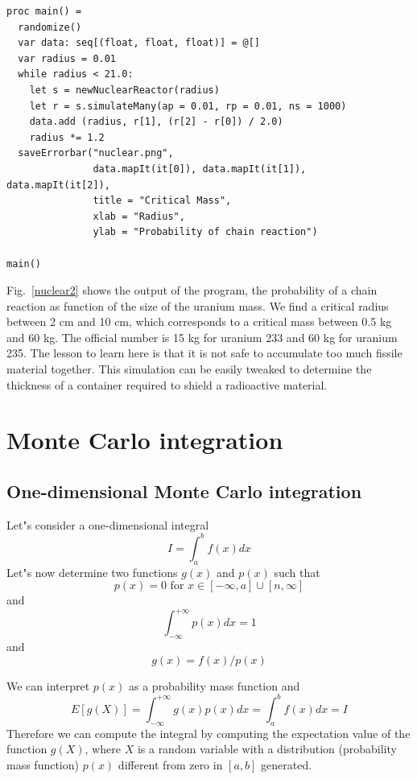 \documentclass[justified, sixbynine]{tufte-book}
\def\ft{\small\tt}
\theoremstyle{plain}%
\newtheorem * {corollary}{Corollary}
\theoremstyle{definition}
\theoremstyle{remark}
\newtheorem * {remark}{Remark}
\newtheorem * {note}{Note}
\begin{document}
\begin{fullwidth}
\begin{lstlisting}[caption={in file: {\ft nuclear.nim}}]
proc main() =
  randomize()
  var data: seq[(float, float, float)] = @[]
  var radius = 0.01
  while radius < 21.0:
    let s = newNuclearReactor(radius)
    let r = s.simulateMany(ap = 0.01, rp = 0.01, ns = 1000)
    data.add (radius, r[1], (r[2] - r[0]) / 2.0)
    radius *= 1.2
  saveErrorbar("nuclear.png",
               data.mapIt(it[0]), data.mapIt(it[1]), data.mapIt(it[2]),
               title = "Critical Mass",
               xlab = "Radius",
               ylab = "Probability of chain reaction")

main()
\end{lstlisting}

Fig.~\ref{nuclear2} shows the output of the program, the probability of a chain reaction as function of the size of the uranium mass. We find a critical radius between 2 cm and 10 cm, which corresponds to a critical mass between 0.5 kg and 60 kg. The official number is 15 kg for uranium 233 and  60 kg for uranium 235. The lesson to learn here is that it is not safe to accumulate too much fissile material together. This simulation can be easily tweaked to determine the thickness of a container required to shield a radioactive material.

\section{Monte Carlo integration}

\goodbreak\subsection{One-dimensional Monte Carlo integration}

Let"s consider a one-dimensional integral
\begin{equation}
I=\int_a^bf(x)dx
\end{equation}
Let"s now determine two functions $g(x)$ and $p(x)$ such that
\begin{equation}
p(x)=0\text{ for }x\in [-\infty , a]\cup [n, \infty ]
\end{equation}
and
\begin{equation}
\int_{-\infty }^{+\infty }p(x)dx=1
\end{equation}
and
\begin{equation}
g(x)=f(x)/p(x)
\end{equation}

We can interpret $p(x)$ as a probability mass function and
\begin{equation}
E[g(X)]=\int_{-\infty }^{+\infty }g(x)p(x)dx=\int_a^bf(x)dx=I
\end{equation}
Therefore we can compute the integral by computing the expectation value of
the function $g(X)$, where $X$ is a random variable with a distribution
(probability mass function) $p(x)$ different from zero in $[a, b]$ generated.


\end{fullwidth}
\end{document}
